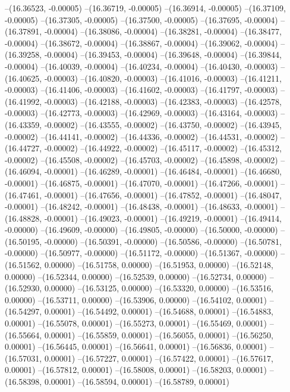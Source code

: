 --(16.36523, -0.00005)
--(16.36719, -0.00005)
--(16.36914, -0.00005)
--(16.37109, -0.00005)
--(16.37305, -0.00005)
--(16.37500, -0.00005)
--(16.37695, -0.00004)
--(16.37891, -0.00004)
--(16.38086, -0.00004)
--(16.38281, -0.00004)
--(16.38477, -0.00004)
--(16.38672, -0.00004)
--(16.38867, -0.00004)
--(16.39062, -0.00004)
--(16.39258, -0.00004)
--(16.39453, -0.00004)
--(16.39648, -0.00004)
--(16.39844, -0.00004)
--(16.40039, -0.00004)
--(16.40234, -0.00004)
--(16.40430, -0.00003)
--(16.40625, -0.00003)
--(16.40820, -0.00003)
--(16.41016, -0.00003)
--(16.41211, -0.00003)
--(16.41406, -0.00003)
--(16.41602, -0.00003)
--(16.41797, -0.00003)
--(16.41992, -0.00003)
--(16.42188, -0.00003)
--(16.42383, -0.00003)
--(16.42578, -0.00003)
--(16.42773, -0.00003)
--(16.42969, -0.00003)
--(16.43164, -0.00003)
--(16.43359, -0.00002)
--(16.43555, -0.00002)
--(16.43750, -0.00002)
--(16.43945, -0.00002)
--(16.44141, -0.00002)
--(16.44336, -0.00002)
--(16.44531, -0.00002)
--(16.44727, -0.00002)
--(16.44922, -0.00002)
--(16.45117, -0.00002)
--(16.45312, -0.00002)
--(16.45508, -0.00002)
--(16.45703, -0.00002)
--(16.45898, -0.00002)
--(16.46094, -0.00001)
--(16.46289, -0.00001)
--(16.46484, -0.00001)
--(16.46680, -0.00001)
--(16.46875, -0.00001)
--(16.47070, -0.00001)
--(16.47266, -0.00001)
--(16.47461, -0.00001)
--(16.47656, -0.00001)
--(16.47852, -0.00001)
--(16.48047, -0.00001)
--(16.48242, -0.00001)
--(16.48438, -0.00001)
--(16.48633, -0.00001)
--(16.48828, -0.00001)
--(16.49023, -0.00001)
--(16.49219, -0.00001)
--(16.49414, -0.00000)
--(16.49609, -0.00000)
--(16.49805, -0.00000)
--(16.50000, -0.00000)
--(16.50195, -0.00000)
--(16.50391, -0.00000)
--(16.50586, -0.00000)
--(16.50781, -0.00000)
--(16.50977, -0.00000)
--(16.51172, -0.00000)
--(16.51367, -0.00000)
--(16.51562, 0.00000)
--(16.51758, 0.00000)
--(16.51953, 0.00000)
--(16.52148, 0.00000)
--(16.52344, 0.00000)
--(16.52539, 0.00000)
--(16.52734, 0.00000)
--(16.52930, 0.00000)
--(16.53125, 0.00000)
--(16.53320, 0.00000)
--(16.53516, 0.00000)
--(16.53711, 0.00000)
--(16.53906, 0.00000)
--(16.54102, 0.00001)
--(16.54297, 0.00001)
--(16.54492, 0.00001)
--(16.54688, 0.00001)
--(16.54883, 0.00001)
--(16.55078, 0.00001)
--(16.55273, 0.00001)
--(16.55469, 0.00001)
--(16.55664, 0.00001)
--(16.55859, 0.00001)
--(16.56055, 0.00001)
--(16.56250, 0.00001)
--(16.56445, 0.00001)
--(16.56641, 0.00001)
--(16.56836, 0.00001)
--(16.57031, 0.00001)
--(16.57227, 0.00001)
--(16.57422, 0.00001)
--(16.57617, 0.00001)
--(16.57812, 0.00001)
--(16.58008, 0.00001)
--(16.58203, 0.00001)
--(16.58398, 0.00001)
--(16.58594, 0.00001)
--(16.58789, 0.00001)
